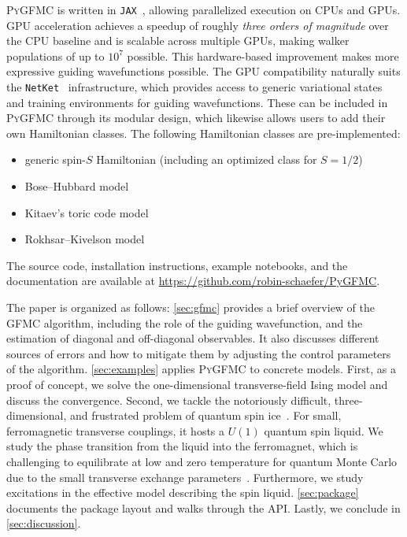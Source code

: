 \documentclass{SciPost}
\newcommand{\JAX}{\texttt{JAX}}
\providecommand{\PyGFMC}{\textsc{PyGFMC}}
\providecommand{\repo}{\href{https://github.com/robin-schaefer/PyGFMC}{https://github.com/robin-schaefer/PyGFMC}}
\begin{document}
\PyGFMC{} is written in \JAX~\cite{jax2018github,flax2020github}, allowing parallelized execution on CPUs and GPUs.
%
GPU acceleration achieves a speedup of roughly \emph{three orders of magnitude} over the CPU baseline and is scalable across multiple GPUs, making walker populations of up to $10^7$ possible.
%
This hardware-based improvement makes more expressive guiding wavefunctions possible.
%
The GPU compatibility naturally suits the \texttt{NetKet}~\cite{SciPostPhysCodeb.7,SciPostPhysCodeb.7-r3.4} infrastructure, which provides access to generic variational states and training environments for guiding wavefunctions.
%
These can be included in \PyGFMC{} through its modular design, which likewise allows users to add their own Hamiltonian classes.
%
The following Hamiltonian classes are pre-implemented:
\begin{itemize} 
	\item generic spin-$S$ Hamiltonian (including an optimized class for $S=1/2$)
	\item Bose--Hubbard model
	\item Kitaev's toric code model~\cite{kitaev_fault_2003}
	\item Rokhsar--Kivelson model~\cite{rokhsar_superconductivity_1988}
\end{itemize}
The source code, installation instructions, example notebooks, and the documentation are available at \repo{}.


The paper is organized as follows: \autoref{sec:gfmc} provides a brief overview of the GFMC algorithm, including the role of the guiding wavefunction, and the estimation of diagonal and off-diagonal observables.
%
It also discusses different sources of errors and how to mitigate them by adjusting the control parameters of the algorithm.
%
\autoref{sec:examples} applies \PyGFMC{} to concrete models. 
%
First, as a proof of concept, we solve the one-dimensional transverse-field Ising model and discuss the convergence.
%
Second, we tackle the notoriously difficult, three-dimensional, and frustrated problem of quantum spin ice~\cite{hermele_pyrochlore_2004,benton_seeing_2012,shannon_quantum_2012,shannon_quantum_2021}. 
%
For small, ferromagnetic transverse couplings, it hosts a $U(1)$ quantum spin liquid.
%
We study the phase transition from the liquid into the ferromagnet, which is challenging to equilibrate at low and zero temperature for quantum Monte Carlo due to the small transverse exchange parameters~\cite{kato_numerical_2015,huang_extended_2020}.
%
Furthermore, we study excitations in the effective model describing the spin liquid.
%
\autoref{sec:package} documents the package layout and walks through the API.
%
Lastly, we conclude in \autoref{sec:discussion}.
\end{document}
